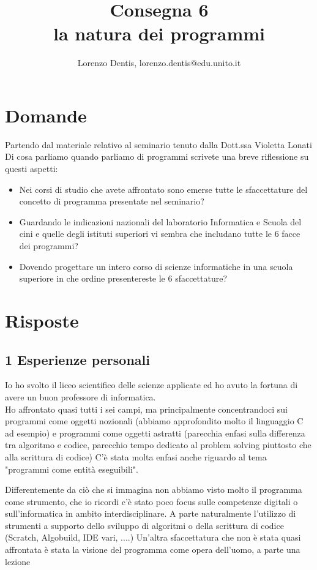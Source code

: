 \documentclass[a4paper]{article}
\begin{document}
\author{Lorenzo Dentis, lorenzo.dentis@edu.unito.it}
\title{Consegna 6 \\ \large la natura dei programmi}
\maketitle

\section{Domande}
Partendo dal materiale relativo al seminario tenuto dalla Dott.ssa Violetta Lonati Di cosa parliamo quando parliamo di programmi scrivete una breve riflessione su questi aspetti:
\begin{itemize}
	\item Nei corsi di studio che avete affrontato sono emerse tutte le sfaccettature del concetto di programma presentate nel seminario?
	\item Guardando le indicazioni nazionali del laboratorio Informatica e Scuola del cini e quelle degli istituti superiori vi sembra che includano tutte le 6 facce dei programmi?
	\item Dovendo progettare un intero corso di scienze informatiche in una scuola superiore in che ordine presentereste le 6 sfaccettature?
\end{itemize}
\section{Risposte}
\subsection{1 Esperienze personali}
Io ho svolto il liceo scientifico delle scienze applicate ed ho avuto la fortuna di avere un buon professore di informatica.\\
Ho affrontato quasi tutti i sei campi, ma principalmente concentrandoci sui programmi come oggetti nozionali (abbiamo approfondito molto il linguaggio C ad esempio) e programmi come oggetti astratti (parecchia enfasi sulla differenza tra algoritmo e codice, parecchio tempo dedicato al problem solving piuttosto che alla scrittura di codice)
C'è stata molta enfasi anche riguardo al tema "programmi come entità eseguibili".




Differentemente da ciò che si immagina non abbiamo visto molto il programma come strumento, che io ricordi c'è stato poco focus sulle competenze digitali o sull'informatica in ambito interdisciplinare. A parte naturalmente l'utilizzo di strumenti a supporto dello sviluppo di algoritmi o della scrittura di codice (Scratch, Algobuild, IDE vari, ....)
Un'altra sfaccettatura che non è stata quasi affrontata è stata la visione del programma come opera dell’uomo, a parte una lezione 
\end{document}
